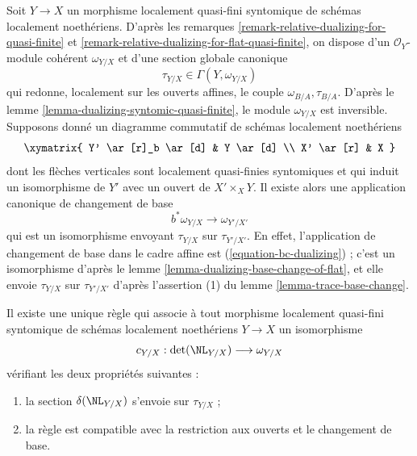 \noindent
Soit $Y \to X$ un morphisme localement quasi-fini syntomique de
schémas localement noethériens. D'après les
remarques \ref{remark-relative-dualizing-for-quasi-finite} et
\ref{remark-relative-dualizing-for-flat-quasi-finite}, on dispose
d'un $\mathcal{O}_Y$-module cohérent $\omega_{Y/X}$ et d'une section globale
canonique
$$
\tau_{Y/X} \in \Gamma(Y, \omega_{Y/X})
$$
qui redonne, localement sur les ouverts affines, le couple $\omega_{B/A}, \tau_{B/A}$.
D'après le lemme \ref{lemma-dualizing-syntomic-quasi-finite}, le module
$\omega_{Y/X}$ est inversible. Supposons donné un diagramme commutatif de
schémas localement noethériens
$$
\xymatrix{
Y' \ar[r]_b \ar[d] & Y \ar[d] \\
X' \ar[r] & X
}
$$
dont les flèches verticales sont localement quasi-finies syntomiques et qui
induit un isomorphisme de $Y'$ avec un ouvert de $X' \times_X Y$.
Il existe alors une application canonique de changement de base
$$
b^*\omega_{Y/X} \longrightarrow \omega_{Y'/X'}
$$
qui est un isomorphisme
envoyant $\tau_{Y/X}$ sur $\tau_{Y'/X'}$. En effet, l'application de changement de base
dans le cadre affine est (\ref{equation-bc-dualizing}) ; c'est un
isomorphisme d'après le lemme \ref{lemma-dualizing-base-change-of-flat}, et elle
envoie $\tau_{Y/X}$ sur $\tau_{Y'/X'}$ d'après
l'assertion (1) du lemme \ref{lemma-trace-base-change}.

\begin{proposition}
\label{proposition-tate-map}
Il existe une unique règle qui associe à tout morphisme localement quasi-fini syntomique
de schémas localement noethériens $Y \to X$ un isomorphisme
$$
c_{Y/X} : \det(\NL_{Y/X}) \longrightarrow \omega_{Y/X}
$$
vérifiant les deux propriétés suivantes :
\begin{enumerate}
\item la section $\delta(\NL_{Y/X})$ s'envoie sur $\tau_{Y/X}$ ;
\item la règle est compatible avec la restriction aux ouverts et le
changement de base.
\end{enumerate}
\end{proposition}

